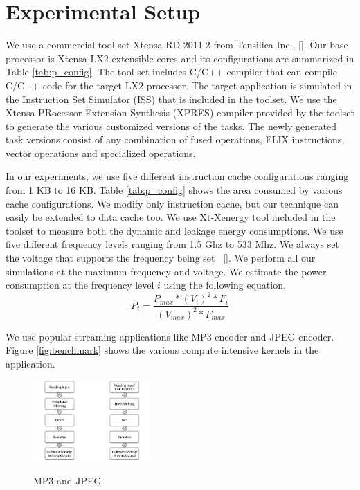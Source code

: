 \section{Experimental Setup}
\label{sec:experiment}

We use a commercial tool set Xtensa RD-2011.2 from Tensilica Inc., \ref{}. Our base processor is Xtensa LX2 extensible cores and its configurations are summarized in Table \ref{tab:p_config}. The tool set includes C/C++ compiler that can compile C/C++ code for the target LX2 processor. The target application is simulated in the Instruction Set Simulator (ISS) that is included in the toolset. We use the Xtensa PRocessor Extension Synthesis (XPRES) compiler provided by the toolset to generate the various customized versions of the tasks. The newly generated task versions consist of any combination of fused operations, FLIX instructions, vector operations and specialized operations. 

In our experiments, we use five different instruction cache configurations ranging from 1 KB to 16 KB. Table \ref{tab:p_config} shows the area consumed by various cache configurations. We modify only instruction cache, but our technique can easily be extended to data cache too. We use Xt-Xenergy tool included in the toolset to measure both the dynamic and leakage energy consumptions. We use five different frequency levels ranging from 1.5 Ghz to 533 Mhz. We always set the voltage that supports the frequency being set ~\ref{}. We perform all our simulations at the maximum frequency and voltage. We estimate the power consumption at the frequency level $i$ using the following equation,
\begin{equation}
P_i = \frac{P_{max} * (V_i)^2 * F_i} {(V_{max})^2 * F_{max}}
\end{equation}  

We use popular streaming applications like MP3 encoder and JPEG encoder. Figure \ref{fig:benchmark} shows the various compute intensive kernels in the application. 

\begin{figure}[h]
\label{fig:benchmark}
\center
\includegraphics[width=0.40\textwidth, height=0.32\textwidth]{benchmark.pdf}
\label{fig:cache-size}
\caption {MP3 and JPEG}
\end{figure}

